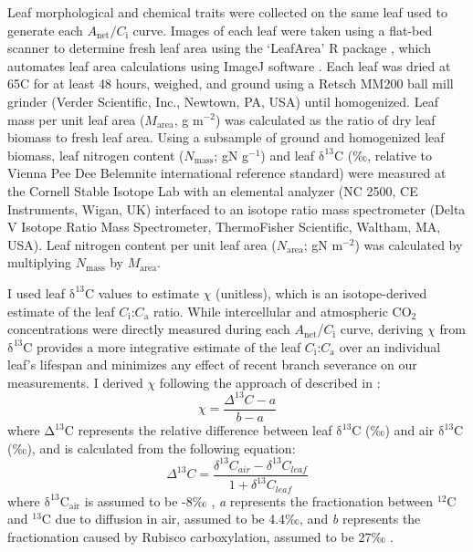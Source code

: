 Leaf morphological and chemical traits were collected on the same leaf used to generate each $A_\mathrm{net}/C_\mathrm{i}$ curve. Images of each leaf were taken using a flat-bed scanner to determine fresh leaf area using the `LeafArea' R package , which automates leaf area calculations using ImageJ software . Each leaf was dried at 65\textdegree{}C for at least 48 hours, weighed, and ground using a Retsch MM200 ball mill grinder (Verder Scientific, Inc., Newtown, PA, USA) until homogenized. Leaf mass per unit leaf area ($M_\mathrm{area}$, g m$^{-2}$) was calculated as the ratio of dry leaf biomass to fresh leaf area. Using a subsample of ground and homogenized leaf biomass, leaf nitrogen content ($N_\mathrm{mass}$; gN g$^{-1}$) and leaf $\mathrm{\delta^{13}C}$ (‰, relative to Vienna Pee Dee Belemnite international reference standard) were measured at the Cornell Stable Isotope Lab with an elemental analyzer (NC 2500, CE Instruments, Wigan, UK) interfaced to an isotope ratio mass spectrometer (Delta V Isotope Ratio Mass Spectrometer, ThermoFisher Scientific, Waltham, MA, USA). Leaf nitrogen content per unit leaf area ($N_\mathrm{area}$; gN m$^{-2}$) was calculated by multiplying $N_\mathrm{mass}$ by $M_\mathrm{area}$.

I used leaf $\mathrm{\delta^{13}}$C values to estimate $\chi$ (unitless), which is an isotope-derived estimate of the leaf $C_\mathrm{i}$:$C_\mathrm{a}$ ratio. While intercellular and atmospheric CO$_2$ concentrations were directly measured during each $A_\mathrm{net}$/$C_\mathrm{i}$ curve, deriving $\chi$ from $\mathrm{\delta^{13}}$C provides a more integrative estimate of the leaf $C_\mathrm{i}$:$C_\mathrm{a}$ over an individual leaf’s lifespan and minimizes any effect of recent branch severance on our measurements. I derived $\chi$ following the approach of  described in :
\begin{equation} \label{eq_2.1}
    \chi= \frac{\Delta^{13}C-a}{b-a}
\end{equation}
\noindent where $\mathrm{\Delta^{13}}$C represents the relative difference between leaf $\mathrm{\delta^{13}}$C (‰) and air $\mathrm{\delta^{13}}$C (‰), and is calculated from the following equation:
\begin{equation} \label{eq_2.2}
    \Delta^{13}C= \frac{\delta^{13}C_{air}-\delta^{13}C_{leaf}}{1+\delta^{13}C_{leaf}}
\end{equation}
\noindent where $\mathrm{\delta^{13}C_{air}}$ is assumed to be -8‰ , \textit{a} represents the fractionation between $^{12}$C and $^{13}$C due to diffusion in air, assumed to be 4.4‰, and \textit{b} represents the fractionation caused by Rubisco carboxylation, assumed to be 27‰ .
    
